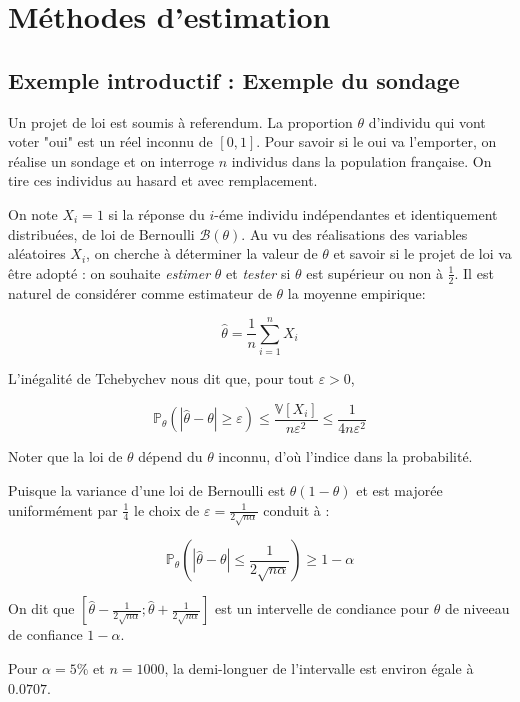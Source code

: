 \chapter{Méthodes d'estimation}

\section{Exemple introductif : Exemple du sondage}

Un projet de loi est soumis à referendum. La proportion $\theta$ d'individu qui vont voter "oui" est un réel inconnu de $[0,1]$. Pour savoir si le oui va l'emporter, on réalise un sondage et on interroge $n$ individus dans la population française. On tire ces individus au hasard et avec remplacement.

On note $X_i = 1$ si la réponse du $i$-éme individu indépendantes et identiquement distribuées, de loi de Bernoulli $\mathcal{B}(\theta)$. Au vu des réalisations des variables aléatoires $X_i$, on cherche à déterminer la valeur de $\theta$ et savoir si le projet de loi va être adopté : on souhaite \textit{estimer} $\theta$ et \textit{tester} si $\theta$ est supérieur ou non à $\frac{1}{2}$. Il est naturel de considérer comme estimateur de $\theta$ la moyenne empirique:

$$
\hat{\theta} = \frac{1}{n} \sum_{i=1}^n X_i
$$  

L'inégalité de Tchebychev nous dit que, pour tout $\varepsilon >0$,

$$
\mathbb{P}_\theta \left( |\hat{\theta} - \theta | \geq \varepsilon \right) \leq \frac{\mathbb{V}[X_i]}{n \varepsilon ^2} \leq \frac{1}{4 n \varepsilon^2}
$$

Noter que la loi de $\theta$ dépend du $\theta$ inconnu, d'où l'indice dans la probabilité.

Puisque la variance d'une loi de Bernoulli est $\theta (1-\theta)$ et est majorée uniformément par $\frac{1}{4}$ le choix de $\varepsilon = \frac{1}{2 \sqrt{n \alpha}}$ conduit à :

$$
\mathbb{P}_\theta \left( |\hat{\theta} - \theta | \leq \frac{1}{2 \sqrt{n \alpha}} \right) \geq 1 - \alpha
$$

On dit que $[\hat{\theta} - \frac{1}{2 \sqrt{n \alpha}} ; \hat{\theta}  + \frac{1}{2 \sqrt{n \alpha}}]$ est un intervelle de condiance pour $\theta$ de niveeau de confiance $1 - \alpha$.

Pour $\alpha = 5 \%$ et $n=1000$, la demi-longuer de l'intervalle est environ égale à $0.0707$.

